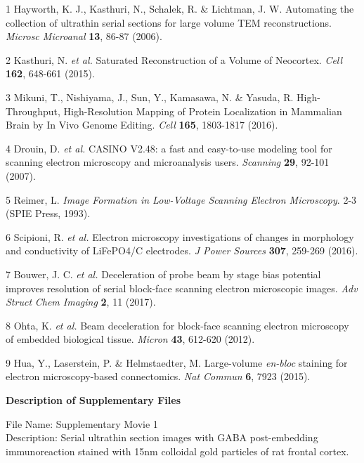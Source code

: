 \documentclass{article}
\begin{document}
\begin{hangpars}
1 Hayworth, K. J., Kasthuri, N., Schalek, R. \& Lichtman, J. W. Automating the collection of ultrathin serial sections for large volume TEM reconstructions. \emph{Microsc Microanal} \textbf{13}, 86-87 (2006).

2 Kasthuri, N. \emph{et al.} Saturated Reconstruction of a Volume of Neocortex. \emph{Cell} \textbf{162}, 648-661 (2015).

3 Mikuni, T., Nishiyama, J., Sun, Y., Kamasawa, N. \& Yasuda, R. High-Throughput, High-Resolution Mapping of Protein Localization in Mammalian Brain by In Vivo Genome Editing. \emph{Cell} \textbf{165}, 1803-1817 (2016).

4 Drouin, D. \emph{et al.} CASINO V2.48: a fast and easy-to-use modeling tool for scanning electron microscopy and microanalysis users. \emph{Scanning} \textbf{29}, 92-101 (2007).

5 Reimer, L. \emph{Image Formation in Low-Voltage Scanning Electron Microscopy}.  2-3 (SPIE Press, 1993).

6 Scipioni, R. \emph{et al.} Electron microscopy investigations of changes in morphology and conductivity of LiFePO4/C electrodes. \emph{J Power Sources} \textbf{307}, 259-269 (2016).

7 Bouwer, J. C. \emph{et al.} Deceleration of probe beam by stage bias potential improves resolution of serial block-face scanning electron microscopic images. \emph{Adv Struct} \emph{Chem Imaging} \textbf{2}, 11 (2017).

8 Ohta, K. \emph{et al.} Beam deceleration for block-face scanning electron microscopy of embedded biological tissue. \emph{Micron} \textbf{43}, 612-620 (2012).

9 Hua, Y., Laserstein, P. \& Helmstaedter, M. Large-volume \emph{en-bloc} staining for electron microscopy-based connectomics. \emph{Nat Commun} \textbf{6}, 7923 (2015).
\end{hangpars}



\noindent\textbf{Description of Supplementary Files}

\noindent File Name: Supplementary Movie 1\\
Description: Serial ultrathin section images with GABA post-embedding immunoreaction stained with 15nm colloidal gold particles of rat frontal cortex.
\end{document}
